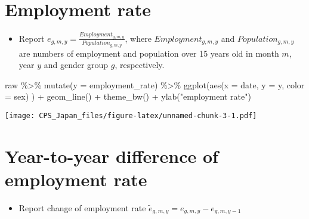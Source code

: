 \documentclass[
]{book}
\newenvironment{Shaded}{\begin{snugshade}}{\end{snugshade}}
\newcommand{\AttributeTok}[1]{\textcolor[rgb]{0.77,0.63,0.00}{#1}}
\newcommand{\FunctionTok}[1]{\textcolor[rgb]{0.00,0.00,0.00}{#1}}
\newcommand{\NormalTok}[1]{#1}
\newcommand{\SpecialCharTok}[1]{\textcolor[rgb]{0.00,0.00,0.00}{#1}}
\newcommand{\StringTok}[1]{\textcolor[rgb]{0.31,0.60,0.02}{#1}}
\providecommand{\tightlist}{%
  \setlength{\itemsep}{0pt}\setlength{\parskip}{0pt}}
\begin{document}
\hypertarget{employment-rate}{%
\section{Employment rate}\label{employment-rate}}

\begin{itemize}
\tightlist
\item
  Report \(e_{g,m,y} = \frac{Employment_{g,m,y}}{Population_{g,m,y}}\), where \(Employment_{g,m,y}\) and \(Population_{g,m,y}\) are numbers of employment and population over 15 years old in month \(m\), year \(y\) and gender group \(g\), respectively.
\end{itemize}

\begin{Shaded}
\begin{Highlighting}[]
\NormalTok{raw }\SpecialCharTok{\%\textgreater{}\%}
  \FunctionTok{mutate}\NormalTok{(}\AttributeTok{y =}\NormalTok{ employment\_rate) }\SpecialCharTok{\%\textgreater{}\%}
  \FunctionTok{ggplot}\NormalTok{(}\FunctionTok{aes}\NormalTok{(}\AttributeTok{x =}\NormalTok{ date,}
             \AttributeTok{y =}\NormalTok{ y,}
             \AttributeTok{color =}\NormalTok{ sex)}
\NormalTok{         ) }\SpecialCharTok{+}
  \FunctionTok{geom\_line}\NormalTok{() }\SpecialCharTok{+}
  \FunctionTok{theme\_bw}\NormalTok{() }\SpecialCharTok{+}
  \FunctionTok{ylab}\NormalTok{(}\StringTok{"employment rate"}\NormalTok{)}
\end{Highlighting}
\end{Shaded}

\texttt{[image: CPS\_Japan\_files/figure-latex/unnamed-chunk-3-1.pdf]}

\hypertarget{year-to-year-difference-of-employment-rate}{%
\section{Year-to-year difference of employment rate}\label{year-to-year-difference-of-employment-rate}}

\begin{itemize}
\tightlist
\item
  Report change of employment rate \(\tilde e_{g,m,y}=e_{g,m,y}-e_{g,m,y-1}\)
\end{itemize}
\end{document}
